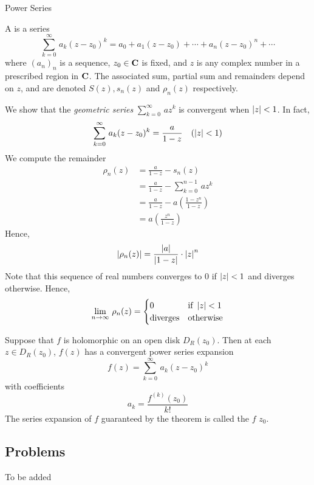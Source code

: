 
\begin{mdframed}
\begin{center}
{\Large Power Series}
\end{center}
\end{mdframed}

\begin{definition}
A  is a series
\[\sum_{k=0}^\infty\,a_k(z - z_0)^k = a_0 + a_1(z - z_0) + \cdots + a_n(z - z_0)^n + \cdots\]
where $(a_n)_n$ is a sequence, $z_0 \in \mathbf C$ is fixed, and $z$ is any complex number in a prescribed region in $\mathbf C$. The associated sum, partial sum and remainders depend on $z$, and are denoted $S(z), s_n(z)$ and $\rho_n(z)$ respectively.
\end{definition}


\begin{example}
We show that the \emph{geometric series} $\sum_{k=0}^\infty\,az^k$ is convergent when $\left\lvert z\right\rvert < 1$. In fact, 
\[\sum_{k=0}^\infty\,a_k(z - z_0)^k = \frac{a}{1 - z}\quad (\left\lvert z\right\rvert < 1)\]
We compute the remainder
\begin{align*}
\rho_n(z) &= \frac{a}{1 - z} - s_n(z)\\[1em]
&= \frac{a}{1 - z} - \sum_{k=0}^{n-1}\,az^k\\[1em]
&= \frac{a}{1 - z} - a\left(\frac{1 - z^n}{1 - z}\right)\\[1em]
&= a\left(\frac{z^n}{1 - z}\right)
\end{align*}
Hence, 
\[\left\lvert\rho_n(z)\right\rvert = \frac{\left\lvert a\right\rvert}{\left\lvert1 - z\right\rvert}\cdot \left\lvert z\right\rvert^n\]
Note that this sequence of real numbers converges to $0$ if $\left\lvert z\right\rvert < 1$ and diverges otherwise. Hence, 
\[\lim_{n \to \infty}\,\rho_n(z) = \begin{cases}0 & \text{if } \left\lvert z\right\rvert < 1\\ \text{diverges} & \text{otherwise} \end{cases}\]
\end{example}

\vspace*{1em}

\begin{theorem}\label{taylor}
Suppose that $f$ is holomorphic on an open disk $D_R(z_0)$. Then at each $z \in D_R(z_0)$, $f(z)$ has a convergent power series expansion
\[f(z) = \sum_{k=0}^\infty\,a_k(z - z_0)^k\]
with coefficients
\[a_k = \frac{f^{(k)}(z_0)}{k!}\]
The series expansion of $f$ guaranteed by the theorem is called the  {\color{blue}$f$}  {\color{blue}$z_0$}.
\end{theorem}

\vspace*{2em}

\subsection{Problems}
\vspace{0.1in}
To be added
%
